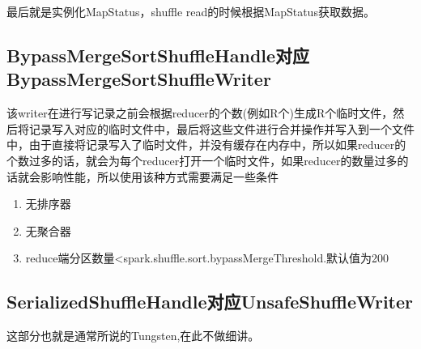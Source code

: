 最后就是实例化MapStatus，shuffle read的时候根据MapStatus获取数据。

\subsection{BypassMergeSortShuffleHandle对应BypassMergeSortShuffleWriter}
该writer在进行写记录之前会根据reducer的个数(例如R个)生成R个临时文件，然后将记录写入对应的临时文件中，最后将这些文件进行合并操作并写入到一个文件中，由于直接将记录写入了临时文件，并没有缓存在内存中，所以如果reducer的个数过多的话，就会为每个reducer打开一个临时文件，如果reducer的数量过多的话就会影响性能，所以使用该种方式需要满足一些条件
\begin{enumerate}[\bfseries 1]
	\item 无排序器
	\item 无聚合器
	\item reduce端分区数量<spark.shuffle.sort.bypassMergeThreshold.默认值为200
\end{enumerate}

\subsection{SerializedShuffleHandle对应UnsafeShuffleWriter}

这部分也就是通常所说的Tungsten,在此不做细讲。
